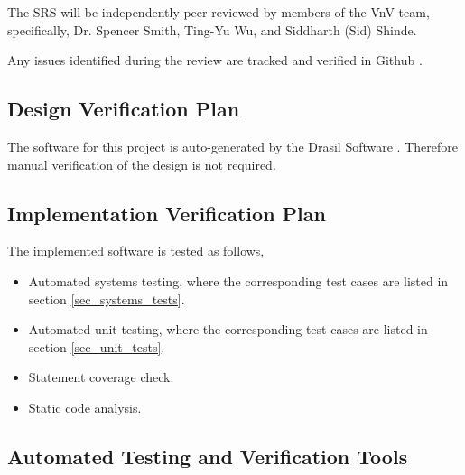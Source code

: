 \documentclass[12pt, titlepage]{article}
\begin{document}
  
The SRS will be independently peer-reviewed by members of the VnV team, specifically,
Dr. Spencer Smith, Ting-Yu Wu, and Siddharth (Sid) Shinde.
 
Any issues identified during the review are tracked and verified in Github \cite{Github}.
 
\subsection{Design Verification Plan}


The software for this project is auto-generated by the Drasil Software \cite{Drasil}. Therefore
manual verification of the design is not required.

\subsection{Implementation Verification Plan}

  
The implemented software is tested as follows,

\begin{itemize}
\item Automated systems testing, where the corresponding test cases
are listed in section \ref{sec_systems_tests}. 
\item Automated unit testing, where the corresponding test cases are
listed in section \ref{sec_unit_tests}. 
\item Statement coverage check. 
\item Static code analysis.
\end{itemize}


\subsection{Automated Testing and Verification Tools} \label{sec_Tools}
\end{document}
